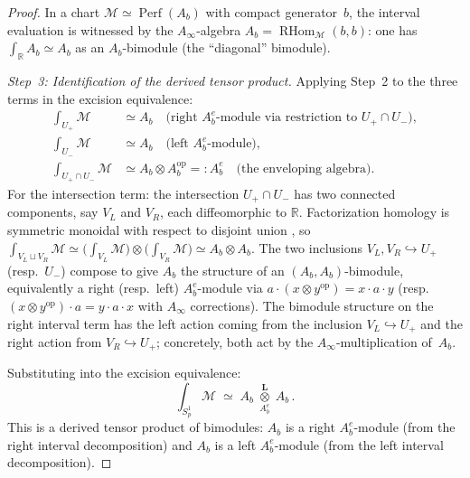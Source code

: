 \begin{proof}
In a chart $\mathcal{M} \simeq \operatorname{Perf}(A_b)$
with compact generator~$b$, the interval evaluation
is witnessed by the $A_\infty$-algebra
$A_b = \operatorname{RHom}_{\mathcal{M}}(b, b)$: one has
$\int_\mathbb{R} A_b \simeq A_b$ as an $A_b$-bimodule (the
``diagonal'' bimodule).

\medskip
\noindent\textit{Step~3: Identification of the derived tensor product.}
Applying Step~2 to the three terms
in the excision equivalence:
\begin{align}
\int_{U_+} \mathcal{M} &\simeq A_b
 \quad\text{(right $A_b^e$-module via restriction to }
 U_+ \cap U_-\text{)},
 \label{eq:thqg-U-plus} \\
\int_{U_-} \mathcal{M} &\simeq A_b
 \quad\text{(left $A_b^e$-module)},
 \label{eq:thqg-U-minus} \\
\int_{U_+ \cap U_-} \mathcal{M} &\simeq A_b \otimes A_b^{\mathrm{op}}
 =: A_b^e
 \quad\text{(the enveloping algebra)}.
 \label{eq:thqg-intersection}
\end{align}
For the intersection term: the intersection
$U_+ \cap U_-$ has two connected components, say $V_L$ and $V_R$,
each diffeomorphic to $\mathbb{R}$. Factorization homology is
symmetric monoidal with respect to disjoint union
\cite[Theorem~3.19]{AF15}, so
$\int_{V_L \sqcup V_R} \mathcal{M}
\simeq
\bigl(\int_{V_L} \mathcal{M}\bigr) \otimes
\bigl(\int_{V_R} \mathcal{M}\bigr)
\simeq A_b \otimes A_b$.
The two inclusions $V_L, V_R \hookrightarrow U_+$
(resp.\ $U_-$) compose to give $A_b$ the structure of an
$(A_b, A_b)$-bimodule, equivalently a right (resp.\ left)
$A_b^e$-module via $a \cdot (x \otimes y^{\mathrm{op}}) = x \cdot a
\cdot y$ (resp.\ $(x \otimes y^{\mathrm{op}}) \cdot a = y \cdot a
\cdot x$ with $A_\infty$ corrections). The bimodule structure
on the right interval term has the left action
coming from the inclusion $V_L \hookrightarrow U_+$ and the right
action from $V_R \hookrightarrow U_+$; concretely, both act by
the $A_\infty$-multiplication of~$A_b$.

Substituting into the excision equivalence:
\begin{equation}\label{eq:thqg-derived-tensor}
\int_{S^1_p} \mathcal{M}
\;\simeq\;
A_b \;\underset{A_b^e}{\overset{\mathbf{L}}{\otimes}}\; A_b\,.
\end{equation}
This is a derived tensor product of bimodules: $A_b$ is a right
$A_b^e$-module (from the right interval decomposition) and
$A_b$ is a left $A_b^e$-module (from the left interval
decomposition).


\end{proof}
